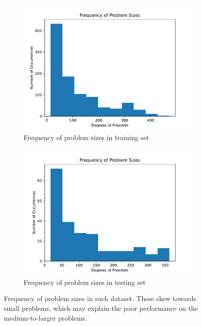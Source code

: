\documentclass{article}
\begin{document}
\begin{figure}[h]
  \centering
  \begin{subfigure}[t]{0.49\textwidth}
    \centering
    \includegraphics[width=\textwidth]{hist_train.pdf}
    \caption{Frequency of problem sizes in training set}
  \end{subfigure}
  \begin{subfigure}[t]{0.49\textwidth}
    \centering
    \includegraphics[width=\textwidth]{hist_test.pdf}
    \caption{Frequency of problem sizes in testing set}
  \end{subfigure}
  \caption{Frequency of problem sizes in each dataset.  These skew towards small problems, which may explain the poor performance on the medium-to-larger problems.}
  \label{fig:histograms}
\end{figure}
\end{document}

